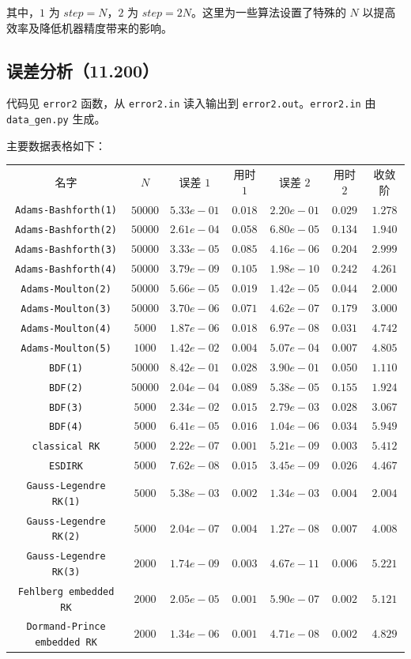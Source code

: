 \documentclass[12pt]{ctexart}
\begin{document}
其中，$1$ 为 $step=N$，$2$ 为 $step=2N$。这里为一些算法设置了特殊的 $N$ 以提高效率及降低机器精度带来的影响。

\subsection*{误差分析（11.200）}

代码见 \texttt{error2} 函数，从 \texttt{error2.in} 读入输出到 \texttt{error2.out}。\texttt{error2.in} 由 \texttt{data\_gen.py} 生成。

主要数据表格如下：

\begin{tabular}{c|c|c|c|c|c|c}
名字&$N$&误差 $1$&用时 $1$&误差 $2$&用时 $2$&收敛阶\\
\texttt{Adams-Bashforth(1)}&$50000$&$5.33e-01$&$0.018$&$2.20e-01$&$0.029$&$1.278$\\
\texttt{Adams-Bashforth(2)}&$50000$&$2.61e-04$&$0.058$&$6.80e-05$&$0.134$&$1.940$\\
\texttt{Adams-Bashforth(3)}&$50000$&$3.33e-05$&$0.085$&$4.16e-06$&$0.204$&$2.999$\\
\texttt{Adams-Bashforth(4)}&$50000$&$3.79e-09$&$0.105$&$1.98e-10$&$0.242$&$4.261$\\
\texttt{Adams-Moulton(2)}&$50000$&$5.66e-05$&$0.019$&$1.42e-05$&$0.044$&$2.000$\\
\texttt{Adams-Moulton(3)}&$50000$&$3.70e-06$&$0.071$&$4.62e-07$&$0.179$&$3.000$\\
\texttt{Adams-Moulton(4)}&$5000$&$1.87e-06$&$0.018$&$6.97e-08$&$0.031$&$4.742$\\
\texttt{Adams-Moulton(5)}&$1000$&$1.42e-02$&$0.004$&$5.07e-04$&$0.007$&$4.805$\\
\texttt{BDF(1)}&$50000$&$8.42e-01$&$0.028$&$3.90e-01$&$0.050$&$1.110$\\
\texttt{BDF(2)}&$50000$&$2.04e-04$&$0.089$&$5.38e-05$&$0.155$&$1.924$\\
\texttt{BDF(3)}&$5000$&$2.34e-02$&$0.015$&$2.79e-03$&$0.028$&$3.067$\\
\texttt{BDF(4)}&$5000$&$6.41e-05$&$0.016$&$1.04e-06$&$0.034$&$5.949$\\
\texttt{classical RK}&$5000$&$2.22e-07$&$0.001$&$5.21e-09$&$0.003$&$5.412$\\
\texttt{ESDIRK}&$5000$&$7.62e-08$&$0.015$&$3.45e-09$&$0.026$&$4.467$\\
\texttt{Gauss-Legendre RK(1)}&$5000$&$5.38e-03$&$0.002$&$1.34e-03$&$0.004$&$2.004$\\
\texttt{Gauss-Legendre RK(2)}&$5000$&$2.04e-07$&$0.004$&$1.27e-08$&$0.007$&$4.008$\\
\texttt{Gauss-Legendre RK(3)}&$2000$&$1.74e-09$&$0.003$&$4.67e-11$&$0.006$&$5.221$\\
\texttt{Fehlberg embedded RK}&$2000$&$2.05e-05$&$0.001$&$5.90e-07$&$0.002$&$5.121$\\
\texttt{Dormand-Prince embedded RK}&$2000$&$1.34e-06$&$0.001$&$4.71e-08$&$0.002$&$4.829$\\
\end{tabular}
\end{document}
